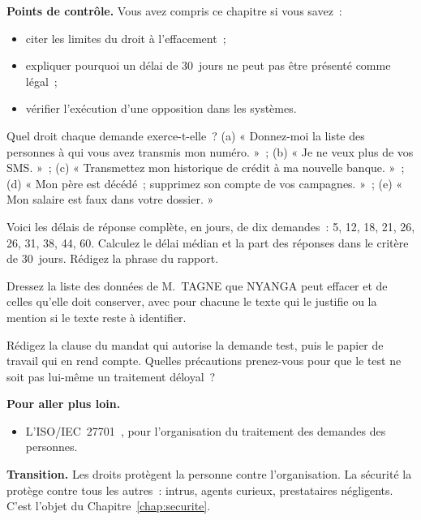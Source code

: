\begin{boxinfo}
\textbf{Points de contrôle.} Vous avez compris ce chapitre si vous savez~:
\begin{itemize}
    \item citer les limites du droit à l'effacement~;
    \item expliquer pourquoi un délai de 30~jours ne peut pas être présenté
          comme légal~;
    \item vérifier l'exécution d'une opposition dans les systèmes.
\end{itemize}
\end{boxinfo}

\begin{boxexo}[title={\ding{45}\quad Exercice~6.1. Quel droit \niveaubase}]
Quel droit chaque demande exerce-t-elle~? (a) « Donnez-moi la liste des
personnes à qui vous avez transmis mon numéro. »~; (b) « Je ne veux plus de
vos SMS. »~; (c) « Transmettez mon historique de crédit à ma nouvelle
banque. »~; (d) « Mon père est décédé~; supprimez son compte de vos
campagnes. »~; (e) « Mon salaire est faux dans votre dossier. »
\end{boxexo}

\begin{boxexo}[title={\ding{45}\quad Exercice~6.2. Mesurer les délais \niveaumoyen}]
Voici les délais de réponse complète, en jours, de dix demandes~: 5, 12,
18, 21, 26, 26, 31, 38, 44, 60. Calculez le délai médian et la part des
réponses dans le critère de 30~jours. Rédigez la phrase du rapport.
\end{boxexo}

\begin{boxexo}[title={\ding{45}\quad Exercice~6.3. L'effacement de M. TAGNE \niveaumoyen}]
Dressez la liste des données de M.~TAGNE que NYANGA peut effacer et de
celles qu'elle doit conserver, avec pour chacune le texte qui le justifie
ou la mention \NEK{} si le texte reste à identifier.
\end{boxexo}

\begin{boxexo}[title={\ding{45}\quad Exercice~6.4. La demande test \niveauexpert}]
Rédigez la clause du mandat qui autorise la demande test, puis le papier de
travail qui en rend compte. Quelles précautions prenez-vous pour que le
test ne soit pas lui-même un traitement déloyal~?
\end{boxexo}

\bigskip

\begin{boxinfo}
\textbf{Pour aller plus loin.}
\begin{itemize}
    \item L'ISO/IEC~27701~\cite{iso27701}, pour l'organisation du traitement
          des demandes des personnes.
\end{itemize}
\end{boxinfo}

\begin{boxinfo}
\textbf{Transition.} Les droits protègent la personne contre l'organisation.
La sécurité la protège contre tous les autres~: intrus, agents curieux,
prestataires négligents. C'est l'objet du Chapitre~\ref{chap:securite}.
\end{boxinfo}
